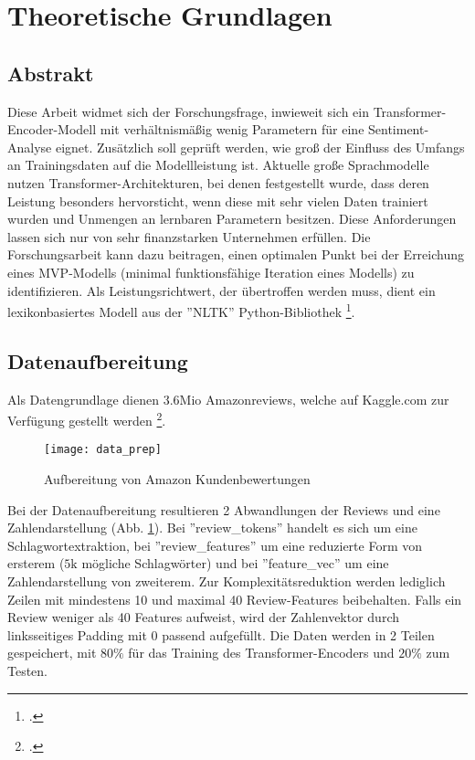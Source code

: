 \newpage
\section{Theoretische Grundlagen}\label{sec:kap2}

\subsection{Abstrakt}\label{sec:patent_info_gehalt}

Diese Arbeit widmet sich der Forschungsfrage, inwieweit sich ein Transformer-Encoder-Modell mit verhältnismäßig wenig Parametern für eine Sentiment-Analyse eignet. Zusätzlich soll geprüft werden, wie groß der Einfluss des Umfangs an Trainingsdaten auf die Modellleistung ist. Aktuelle große Sprachmodelle nutzen Transformer-Architekturen, bei denen festgestellt wurde, dass deren Leistung besonders hervorsticht, wenn diese mit sehr vielen Daten trainiert wurden und Unmengen an lernbaren Parametern besitzen. Diese Anforderungen lassen sich nur von sehr finanzstarken Unternehmen erfüllen. Die Forschungsarbeit kann dazu beitragen, einen optimalen Punkt bei der Erreichung eines MVP-Modells (minimal funktionsfähige Iteration eines Modells) zu identifizieren. Als Leistungsrichtwert, der übertroffen werden muss, dient ein lexikonbasiertes Modell aus der ''NLTK'' Python-Bibliothek \footcite{website:VADER}.


\subsection{Datenaufbereitung}\label{sec:ipc}

Als Datengrundlage dienen $3.6 \text{Mio}$ Amazonreviews, welche auf Kaggle.com zur Verfügung gestellt werden \footcite{website:AmazonReviews}.

\begin{figure}[H]
	\caption{Aufbereitung von Amazon Kundenbewertungen}
	\texttt{[image: data\_prep]}
	\label{fig:data_prep}
	\raggedright
	\vspace{-1.0em}
\end{figure} 

Bei der Datenaufbereitung resultieren 2 Abwandlungen der Reviews und eine Zahlendarstellung (Abb. \ref{fig:data_prep}).
Bei ''review\_tokens'' handelt es sich um eine Schlagwortextraktion, bei ''review\_features'' um eine reduzierte Form von ersterem ($5\text{k}$ mögliche Schlagwörter) und bei ''feature\_vec'' um eine Zahlendarstellung von zweiterem. Zur Komplexitätsreduktion werden lediglich Zeilen mit mindestens 10 und maximal 40 Review-Features beibehalten. Falls ein Review weniger als 40 Features aufweist, wird der Zahlenvektor durch linksseitiges Padding mit $0$ passend aufgefüllt. Die Daten werden in 2 Teilen gespeichert, mit $80\%$ für das Training des Transformer-Encoders und $20\%$ zum Testen.


